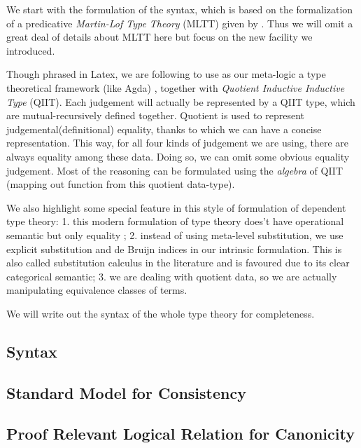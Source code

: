 
We start with the formulation of the syntax, which is based on the formalization of a predicative \textit{Martin-Lof Type Theory} (MLTT) given by \citep{coquand2018canonicity}. Thus we will omit a great deal of details about MLTT here but focus on the new facility we introduced. 

Though phrased in Latex, we are following \citep{kaposi2017type} to use as our meta-logic a type theoretical framework (like Agda) , 
together with \textit{Quotient Inductive Inductive Type} (QIIT). Each judgement will actually be represented by a QIIT type, which are mutual-recursively defined together. Quotient is used to represent judgemental(definitional) equality, thanks to which we can have a concise representation. This way, for all four kinds of judgement we are using, there are always equality among these data. Doing so, we can omit some obvious equality judgement. Most of the reasoning can be formulated using the \textit{algebra} of QIIT (mapping out function from this quotient data-type). 

We also highlight some special feature in this style of formulation of dependent type theory: 1. this modern formulation of type theory does't have operational semantic but only equality 
;
2. instead of using meta-level substitution, we use explicit substitution and de Bruijn indices in our intrinsic formulation. This is also called substitution calculus in the literature and is favoured due to its clear categorical semantic; 
3. we are dealing with quotient data, so we are actually manipulating equivalence classes of terms. 

We will write out the syntax of the whole type theory for completeness.


\newcommand{\denotes}[1]{{\llbracket {#1} \rrbracket}}
\newcommand{\denotesS}[1]{{{\llbracket {#1} \rrbracket}_S}}
\newcommand{\goodCtx}[2]{{ {#1} \ \vdash }}
\newcommand{\goodType}[3]{{ {#1} \vdash {#2} }}
\newcommand{\goodTerm}[3]{{ {#1} \vdash {#2} : {#3} }}
\newcommand{\goodSub}[3]{{ {#1} \vdash {#2} : {#3} }}
\newcommand{\goodSig}[3]{{ {#1} \vdash {#2} \ \  Sig^{#3} }}
\newcommand{\goodWSig}[3]{{ {#1} \vdash {#2} \ \ WSig^{#3} }}
\newcommand{\goodSeal}[4]{{ {#1} \vdash {#2} : {#3} \  |\  {#4} }}
\newcommand{\goodInh}[4]{{ {#1} \vdash {#2} : {#3} \twoheadrightarrow {#4}}}
\newcommand{\nat}{\mathbf{N}}

\newcommand{\cU}{{\mathcal{U}}}
\newcommand{\cB}{{\mathbb{B}}}
\newcommand{\cL}{{\mathcal{L}}}
\newcommand{\bW}{{\mathbb{W}}}



\subsection{Syntax}





\subsection{Standard Model for Consistency}




\subsection{Proof Relevant Logical Relation for Canonicity}

